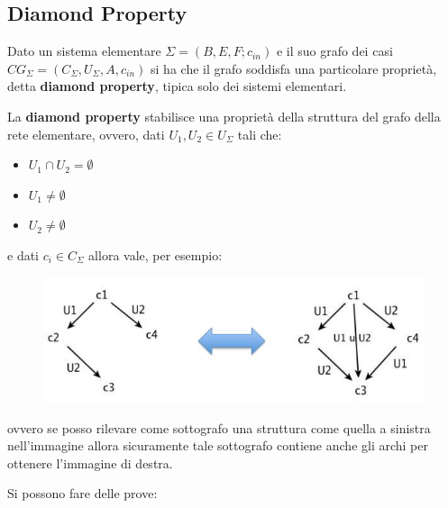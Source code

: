 \documentclass[a4paper,12pt, oneside]{book}
\begin{document}
\subsection{Diamond Property}
Dato un sistema elementare $\Sigma = (B,E,F;c_{in})$ e il suo grafo dei casi
$CG_\Sigma=(C_\Sigma, U_\Sigma, A, c_{in})$ si ha 
che il grafo soddisfa una particolare proprietà, detta \textbf{diamond
  property}, tipica solo dei sistemi elementari.
\begin{definizione}
  La \textbf{diamond property} stabilisce una proprietà della struttura del
  grafo della rete elementare, ovvero, dati $U_1,U_2\in U_\Sigma$ tali che:
  \begin{itemize}
    \item $U_1\cap U_2=\emptyset$
    \item $U_1\neq\emptyset$
    \item $U_2\neq\emptyset$
  \end{itemize}
  e dati $c_i\in C_\Sigma$ allora vale, per esempio:
  \begin{figure}[H]
    \centering
    \includegraphics[scale = 0.6]{img/diam.jpg}
    \label{fig:dia}
  \end{figure}
  ovvero se posso rilevare come sottografo una struttura come quella a sinistra
  nell'immagine allora sicuramente tale sottografo contiene anche gli
  archi per ottenere l'immagine di destra. 
\end{definizione}
Si possono fare delle prove:
\end{document}
